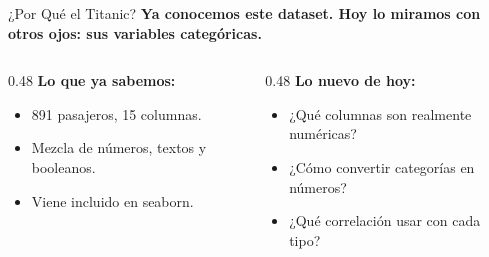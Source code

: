 \documentclass[aspectratio=169, 11pt]{beamer}
\begin{document}
\begin{frame}[shrink=5]{¿Por Qué el Titanic?}
  \vspace{-4pt}
  {\footnotesize\color{arcaDark}\bfseries
    Ya conocemos este dataset. Hoy lo miramos con otros ojos:
    sus variables categóricas.}

  \vspace{6pt}
  \begin{columns}[T]
    \begin{column}{0.48\textwidth}
      {\footnotesize\bfseries\color{arcaDark} Lo que ya sabemos:}
      \vspace{4pt}

      {\footnotesize
      \begin{itemize}\setlength{\itemsep}{5pt}
        \item[{\color{codeGreen}\faCheckCircle}]
          891 pasajeros, 15 columnas.
        \item[{\color{codeGreen}\faCheckCircle}]
          Mezcla de números, textos y booleanos.
        \item[{\color{codeGreen}\faCheckCircle}]
          Viene incluido en seaborn.
      \end{itemize}
      }
    \end{column}

    \begin{column}{0.48\textwidth}
      {\footnotesize\bfseries\color{arcaRed} Lo nuevo de hoy:}
      \vspace{4pt}

      {\footnotesize
      \begin{itemize}\setlength{\itemsep}{5pt}
        \item[{\color{arcaRed}\faArrowRight}]
          ¿Qué columnas son realmente numéricas?
        \item[{\color{arcaRed}\faArrowRight}]
          ¿Cómo convertir categorías en números?
        \item[{\color{arcaRed}\faArrowRight}]
          ¿Qué correlación usar con cada tipo?
      \end{itemize}
      }
    \end{column}
  \end{columns}
\end{frame}
\end{document}

